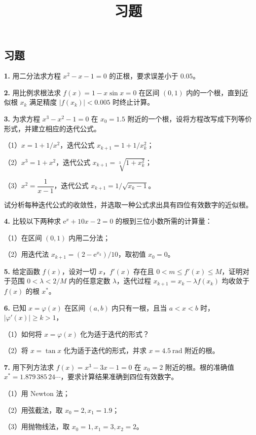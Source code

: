 \documentclass[
  10pt,
  fontset=fandol]{ctexart}
\title{习题}
\author{}
\date{}
\begin{document}
\maketitle

\subsection{习题}\label{ux4e60ux9898}

\textbf{1.} 用二分法求方程 \(x^2-x-1=0\) 的正根，要求误差小于 \(0.05\)。

\textbf{2.} 用比例求根法求 \(f(x)=1-x\sin x=0\) 在区间 \((0,1)\) 内的一个根，直到近似根 \(x_k\) 满足精度 \(|f(x_k)|<0.005\) 时终止计算。

\textbf{3.} 为求方程 \(x^3-x^2-1=0\) 在 \(x_0=1.5\) 附近的一个根，设将方程改写成下列等价形式，并建立相应的迭代公式。

（1）\(x=1+1/x^2\)，迭代公式 \(x_{k+1}=1+1/x_k^2\)；

（2）\(x^3=1+x^2\)，迭代公式 \(x_{k+1}=\sqrt[3]{1+x_k^2}\)；

（3）\(x^2=\dfrac{1}{x-1}\)，迭代公式 \(x_{k+1}=1/\sqrt{x_k-1}\)。

试分析每种迭代公式的收敛性，并选取一种公式求出具有四位有效数字的近似根。

\textbf{4.} 比较以下两种求 \(\mathrm{e}^x+10x-2=0\) 的根到三位小数所需的计算量：

（1）在区间 \((0,1)\) 内用二分法；

（2）用迭代法 \(x_{k+1}=(2-\mathrm{e}^{x_k})/10\)，取初值 \(x_0=0\)。

\textbf{5.} 给定函数 \(f(x)\)，设对一切 \(x\)，\(f'(x)\) 存在且 \(0<m\leqslant f'(x)\leqslant M\)，证明对于范围 \(0<\lambda<2/M\) 内的任意定数 \(\lambda\)，迭代过程 \(x_{k+1}=x_k-\lambda f(x_k)\) 均收敛于 \(f(x)\) 的根 \(x^*\)。

\textbf{6.} 已知 \(x=\varphi(x)\) 在区间 \((a,b)\) 内只有一根，且当 \(a<x<b\) 时，\(|\varphi'(x)|\geqslant k>1\)，

（1）如何将 \(x=\varphi(x)\) 化为适于迭代的形式？

（2）将 \(x=\tan x\) 化为适于迭代的形式，并求 \(x=4.5\ \mathrm{rad}\) 附近的根。

\textbf{7.} 用下列方法求 \(f(x)=x^3-3x-1=0\) 在 \(x_0=2\) 附近的根。根的准确值 \(x^*=1.879\,385\,24\cdots\)，要求计算结果准确到四位有效数字。

（1）用 Newton 法；

（2）用弦截法，取 \(x_0=2,x_1=1.9\)；

（3）用抛物线法，取 \(x_0=1,x_1=3,x_2=2\)。
\end{document}
